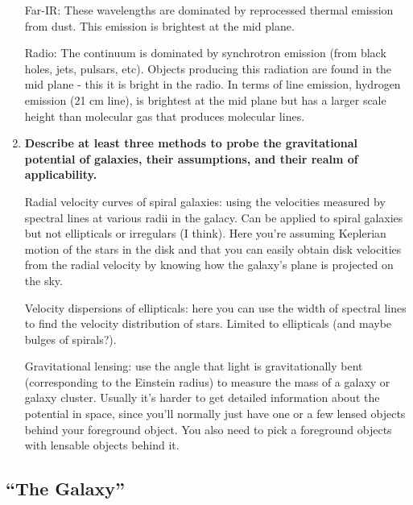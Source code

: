 \begin{enumerate}
Far-IR:  These wavelengths are dominated by reprocessed thermal emission from dust.  This emission is brightest at the mid plane.

Radio:  The continuum is dominated by synchrotron emission (from black holes, jets, pulsars, etc).  Objects producing this radiation are found in the mid plane - this it is bright in the radio.  In terms of line emission, hydrogen emission (21 cm line), is brightest at the mid plane but has a larger scale height than molecular gas that produces molecular lines.  

      
\item \textbf{Describe at least three methods to probe the gravitational potential of galaxies,
      their assumptions, and their realm of applicability.}
      
      Radial velocity curves of spiral galaxies: using the velocities measured by spectral lines at various radii in the galacy. Can be applied to spiral galaxies but not ellipticals or irregulars (I think). Here you're assuming Keplerian motion of the stars in the disk and that you can easily obtain disk velocities from the radial velocity by knowing how the galaxy's plane is projected on the sky.
      
      Velocity dispersions of ellipticals: here you can use the width of spectral lines to find the velocity distribution of stars. Limited to ellipticals (and maybe bulges of spirals?).
      
      Gravitational lensing: use the angle that light is gravitationally bent (corresponding to the Einstein radius) to measure the mass of a galaxy or galaxy cluster. Usually it's harder to get detailed information about the potential in space, since you'll normally just have one or a few lensed objects behind your foreground object. You also need to pick a foreground objects with lensable objects behind it.
      
\end{enumerate}

\subsection{``The Galaxy''}

